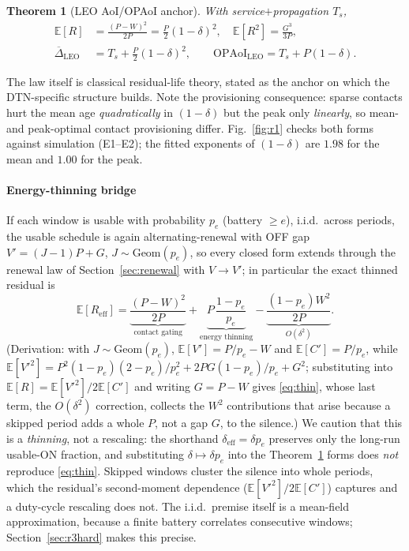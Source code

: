 \documentclass[twocolumn,3p,times,procedia]{elsarticle}
\theoremstyle{plain}
\newtheorem{theorem}{Theorem}
\theoremstyle{remark}
\newcommand{\AoI}{\Delta}
\newcommand{\OPAoI}{\mathrm{OPAoI}}
\newcommand{\E}{\mathbb{E}}
\newcommand{\dutyeff}{\delta_{\mathrm{eff}}}
\newcommand{\peff}{p_e}
\begin{document}
\begin{theorem}[LEO AoI/OPAoI anchor]\label{thm:r1}
With service$+$propagation $T_s$,
\begin{align}
\E[R]&=\frac{(P-W)^2}{2P}=\tfrac{P}{2}(1-\delta)^2,\quad
\E[R^2]=\frac{G^3}{3P},\\
\overline{\AoI}_{\mathrm{LEO}}&=T_s+\tfrac{P}{2}(1-\delta)^2,\qquad
\OPAoI_{\mathrm{LEO}}=T_s+P(1-\delta).
\end{align}
\end{theorem}
The law itself is classical residual-life theory, stated as the anchor
on which the DTN-specific structure builds. Note the provisioning
consequence: sparse contacts hurt the mean age \emph{quadratically} in
$(1-\delta)$ but the peak only \emph{linearly}, so mean- and
peak-optimal contact provisioning differ. Fig.~\ref{fig:r1} checks both
forms against simulation (E1--E2); the fitted exponents of $(1-\delta)$
are $1.98$ for the mean and $1.00$ for the peak.



\paragraph*{Energy-thinning bridge}
If each window is usable with probability $\peff$ (battery $\ge e$),
i.i.d.\ across periods, the usable schedule is again alternating-renewal
with OFF gap $V'=(J{-}1)P+G$, $J\sim\mathrm{Geom}(\peff)$, so every
closed form extends through the renewal law of
Section~\ref{sec:renewal} with $V\to V'$; in particular the exact
thinned residual is
\begin{equation}\label{eq:thin}
\E[R_{\mathrm{eff}}]=
\underbrace{\frac{(P-W)^2}{2P}}_{\text{contact gating}}
+\underbrace{P\,\frac{1-\peff}{\peff}}_{\text{energy thinning}}
-\underbrace{\frac{(1-\peff)W^2}{2P}}_{O(\delta^2)} .
\end{equation}
(Derivation: with $J\sim\mathrm{Geom}(\peff)$, $\E[V']=P/\peff-W$ and
$\E[C']=P/\peff$, while
$\E[V'^2]=P^2(1-\peff)(2-\peff)/\peff^2+2PG(1-\peff)/\peff+G^2$;
substituting into $\E[R]=\E[V'^2]/2\E[C']$ and writing $G=P-W$ gives
\eqref{eq:thin}, whose last term, the $O(\delta^2)$ correction,
collects the $W^2$ contributions that arise because a skipped period
adds a whole $P$, not a gap $G$, to the silence.)
We caution that this is a \emph{thinning}, not a rescaling: the
shorthand $\dutyeff=\delta\peff$ preserves only the long-run usable-ON
fraction, and substituting $\delta\mapsto\delta\peff$ into the
Theorem~\ref{thm:r1} forms does \emph{not} reproduce
\eqref{eq:thin}. Skipped windows cluster the silence into whole
periods, which the residual's second-moment dependence
($\E[V'^2]/2\E[C']$) captures and a duty-cycle rescaling does not. The
i.i.d.\ premise itself is a mean-field approximation, because a finite
battery correlates consecutive windows; Section~\ref{sec:r3hard} makes
this precise.
\end{document}
